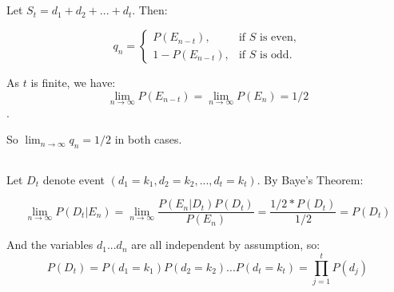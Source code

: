 \documentclass{article}
\begin{document}
\subsection{}
Let $S_t = d_1 + d_2 + ... + d_t$. Then:

$$q_n  = \begin{cases}
  P(E_{n-t}), & \text{if } S \text{ is even}, \\
  1 - P(E_{n-t}), & \text{if }  S \text{ is odd}.
\end{cases}$$

As $t$ is finite, we have:
$$\lim_{n\to\infty} P(E_{n-t}) = \lim_{n\to\infty} P(E_{n})  = 1/2$$. 

So $\lim_{n\to\infty} q_n = 1/2$ in both cases.

\subsection{}
Let $D_t$ denote event $(d_1 = k_1, d_2 = k_2,..., d_t = k_t)$. By Baye's Theorem:

$$ \lim_{n\to\infty} P(D_t | E_n) = \lim_{n\to\infty} \frac{P(E_n | D_t)P(D_t)}{P(E_n)} = \frac{1/2* P(D_t)}{1/2} = P(D_t) $$

And the variables $d_1...d_n$ are all independent by assumption, so:
$$P(D_t) = P(d_1 = k_1) P(d_2 = k_2) ... P(d_t = k_t) = \prod_{j=1}^{t} P(d_j)$$ 
\end{document}
